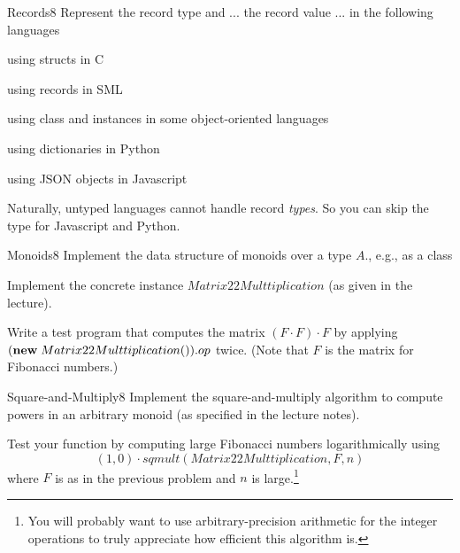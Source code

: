 \documentclass[a4paper]{article}
\begin{document}
\header

\begin{problem}{Records}{8}
Represent the record type and ... the record value ... in the following languages
\begin{compactitem}
 \item using structs in C
 \item using records in SML
 \item using class and instances in some object-oriented languages
 \item using dictionaries in Python
 \item using JSON objects in Javascript
\end{compactitem}

Naturally, untyped languages cannot handle record \emph{types}. So you can skip the type for Javascript and Python.
\end{problem}

\begin{problem}{Monoids}{8}
Implement the data structure of monoids over a type $A$., e.g., as a class

Implement the concrete instance $Matrix22Multtiplication$ (as given in the lecture).

Write a test program that computes the matrix $(F\cdot F)\cdot F$ by applying $({\rm \bf new}\; Matrix22Multtiplication()).op$ twice.
(Note that $F$ is the matrix for Fibonacci numbers.)
\end{problem}

\begin{problem}{Square-and-Multiply}{8}
Implement the square-and-multiply algorithm to compute powers in an arbitrary monoid (as specified in the lecture notes).

Test your function by computing large Fibonacci numbers logarithmically using
\[(1,0)\cdot sqmult(Matrix22Multtiplication, F, n)\]
where $F$ is as in the previous problem and $n$ is large.\footnote{You will probably want to use arbitrary-precision arithmetic for the integer operations to truly appreciate how efficient this algorithm is.}
\end{problem}
\end{document}
